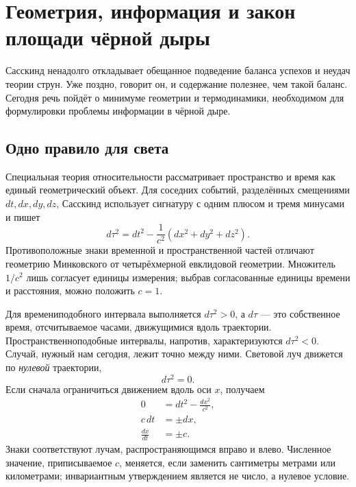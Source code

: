 \chapter{Геометрия, информация и закон площади чёрной дыры}


Сасскинд ненадолго откладывает обещанное подведение баланса успехов и неудач теории струн. Уже поздно, говорит он, и содержание полезнее, чем такой баланс. Сегодня речь пойдёт о минимуме геометрии и термодинамики, необходимом для формулировки проблемы информации в чёрной дыре.

\section{Одно правило для света}

Специальная теория относительности рассматривает пространство и время как единый геометрический объект. Для соседних событий, разделённых смещениями \(dt,dx,dy,dz\), Сасскинд использует сигнатуру с одним плюсом и тремя минусами и пишет
\begin{equation}
d\tau^2=dt^2-\frac{1}{c^2}\left(dx^2+dy^2+dz^2\right).
\end{equation}
Противоположные знаки временной и пространственной частей отличают геометрию Минковского от четырёхмерной евклидовой геометрии. Множитель \(1/c^2\) лишь согласует единицы измерения; выбрав согласованные единицы времени и расстояния, можно положить \(c=1\).

Для времениподобного интервала выполняется \(d\tau^2>0\), а \(d\tau\) — это собственное время, отсчитываемое часами, движущимися вдоль траектории. Пространственноподобные интервалы, напротив, характеризуются \(d\tau^2<0\). Случай, нужный нам сегодня, лежит точно между ними. Световой луч движется по \emph{нулевой} траектории,
\begin{equation}
d\tau^2=0.
\end{equation}
Если сначала ограничиться движением вдоль оси \(x\), получаем
\begin{align}
0&=dt^2-\frac{dx^2}{c^2},\\
c\,dt&=\pm dx,\\
\frac{dx}{dt}&=\pm c.
\end{align}
Знаки соответствуют лучам, распространяющимся вправо и влево. Численное значение, приписываемое \(c\), меняется, если заменить сантиметры метрами или километрами; инвариантным утверждением является не число, а нулевое условие.

